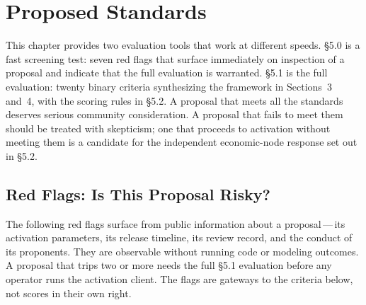 \documentclass[11pt, twoside, openright]{book}
\newcommand{\sect}[1]{\S#1}
\begin{document}
\chapter{Proposed Standards}
\label{ch:standards}
\setcounter{section}{-1}  %

This chapter provides two evaluation tools that work at different speeds. \sect{5.0} is a fast screening test: seven red flags that surface immediately on inspection of a proposal and indicate that the full evaluation is warranted. \sect{5.1} is the full evaluation: twenty binary criteria synthesizing the framework in Sections~3 and~4, with the scoring rules in \sect{5.2}. A proposal that meets all the standards deserves serious community consideration. A proposal that fails to meet them should be treated with skepticism; one that proceeds to activation without meeting them is a candidate for the independent economic-node response set out in \sect{5.2}.

\section{Red Flags: Is This Proposal Risky?}

The following red flags surface from public information about a proposal\,---\,its activation parameters, its release timeline, its review record, and the conduct of its proponents. They are observable without running code or modeling outcomes. A proposal that trips two or more needs the full \sect{5.1} evaluation before any operator runs the activation client. The flags are gateways to the criteria below, not scores in their own right.
\end{document}
